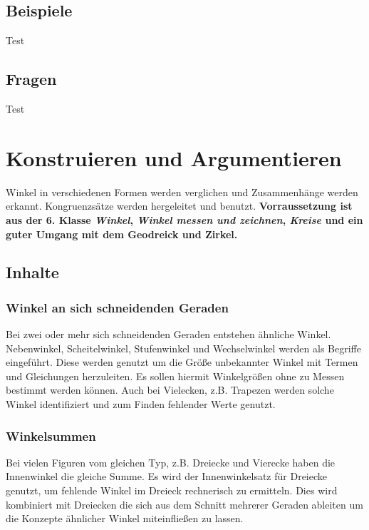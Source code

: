 \documentclass{article}
\begin{document}
\subsection{Beispiele}
\begin{tcolorbox}[colback=gray!5!white,colframe=gray!25!black]
Test
\end{tcolorbox}
\subsection{Fragen}
\begin{tcolorbox}[colback=blue!5!white,colframe=blue!25!black]
Test
\end{tcolorbox}
\newpage

\section{Konstruieren und Argumentieren}
Winkel in verschiedenen Formen werden verglichen und Zusammenhänge werden erkannt. Kongruenzsätze werden hergeleitet und benutzt.
\textbf{Vorraussetzung ist aus der 6. Klasse \textit{Winkel}, \textit{Winkel messen und zeichnen}, \textit{Kreise} und ein guter Umgang mit dem Geodreick und Zirkel.}
\subsection{Inhalte}
\subsubsection*{Winkel an sich schneidenden Geraden}
Bei zwei oder mehr sich schneidenden Geraden entstehen ähnliche Winkel. Nebenwinkel, Scheitelwinkel, Stufenwinkel und Wechselwinkel werden als Begriffe eingeführt.
Diese werden genutzt um die Größe unbekannter Winkel mit Termen und Gleichungen herzuleiten.
Es sollen hiermit Winkelgrößen ohne zu Messen bestimmt werden können. Auch bei Vielecken, z.B. Trapezen werden solche Winkel identifiziert und zum Finden fehlender Werte genutzt. 

\subsubsection*{Winkelsummen}
Bei vielen Figuren vom gleichen Typ, z.B. Dreiecke und Vierecke haben die Innenwinkel die gleiche Summe.
Es wird der Innenwinkelsatz für Dreiecke genutzt,  um fehlende Winkel im Dreieck rechnerisch zu ermitteln.
Dies wird kombiniert mit Dreiecken die sich aus dem Schnitt mehrerer Geraden ableiten um die Konzepte ähnlicher Winkel miteinfließen zu lassen.
\end{document}
